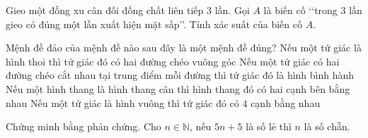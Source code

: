 \begin{bt}%
	Gieo một đồng xu cân đối đồng chất liên tiếp $3$ lần. Gọi $A$ là biến cố \lq\lq trong $3$ lần gieo có đúng một lần xuất hiện mặt sấp\rq\rq. Tính xác suất của biến cố $A$.
\end{bt}

\begin{ex}%
	 Mệnh đề đảo của mệnh đề nào sau đây là một mệnh đề đúng?
	\choice 
		{Nếu một tứ giác là hình thoi thì tứ giác đó có hai đường  chéo vuông góc}
		{\True Nếu một tứ giác có hai đường chéo cắt nhau tại trung điểm mỗi đường thì tứ giác đó là  hình bình hành}
		{Nếu  một hình thang là hình thang cân thì hình thang đó có hai cạnh bên bằng nhau}
		{Nếu một tứ giác là hình vuông thì tứ giác đó có $4$ cạnh bằng nhau} 
\end{ex}

\begin{bt}%
	Chứng minh bằng  phản chứng. Cho $n \in \mathbb{N}$, nếu $5n+5$ là số lẻ thì $n$ là số chẵn.
\end{bt}

